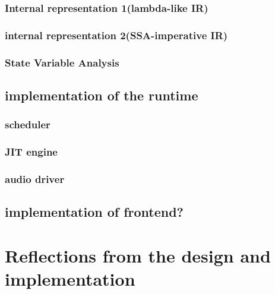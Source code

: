 \hypertarget{internal-representation-1lambda-like-ir}{%
\subsection{Internal representation 1(lambda-like
IR)}\label{internal-representation-1lambda-like-ir}}

\hypertarget{internal-representation-2ssa-imperative-ir}{%
\subsection{internal representation 2(SSA-imperative
IR)}\label{internal-representation-2ssa-imperative-ir}}

\hypertarget{state-variable-analysis}{%
\subsection{State Variable Analysis}\label{state-variable-analysis}}

\hypertarget{implementation-of-the-runtime}{%
\section{implementation of the
runtime}\label{implementation-of-the-runtime}}

\hypertarget{scheduler}{%
\subsection{scheduler}\label{scheduler}}

\hypertarget{jit-engine}{%
\subsection{JIT engine}\label{jit-engine}}

\hypertarget{audio-driver}{%
\subsection{audio driver}\label{audio-driver}}

\hypertarget{implementation-of-frontend}{%
\section{implementation of frontend?}\label{implementation-of-frontend}}

\hypertarget{reflections-from-the-design-and-implementation}{%
\chapter{Reflections from the design and
implementation}\label{reflections-from-the-design-and-implementation}}

